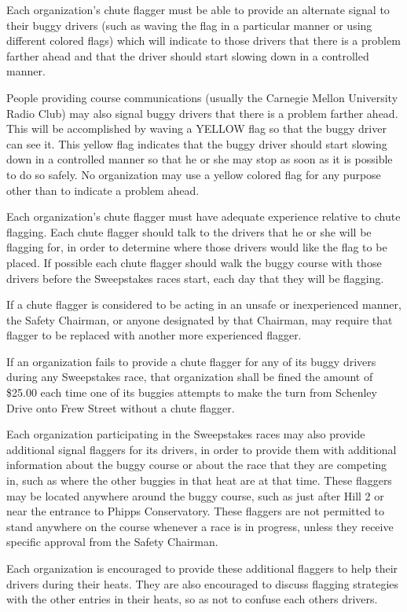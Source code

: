 Each organization's chute flagger must be able to provide an alternate signal to their buggy drivers (such as waving the flag in a particular manner or using different colored flags) which will indicate to those drivers that there is a problem farther ahead and that the driver should start slowing down in a controlled manner.

People providing course communications (usually the Carnegie Mellon University Radio Club) may also signal buggy drivers that there is a problem farther ahead. This will be accomplished by waving a YELLOW flag so that the buggy driver can see it. This yellow flag indicates that the buggy driver should start slowing down in a controlled manner so that he or she may stop as soon as it is possible to do so safely. No organization may use a yellow colored flag for any purpose other than to indicate a problem ahead.

Each organization's chute flagger must have adequate experience relative to chute flagging. Each chute flagger should talk to the drivers that he or she will be flagging for, in order to determine where those drivers would like the flag to be placed. If possible each chute flagger should walk the buggy course with those drivers before the Sweepstakes races start, each day that they will be flagging.

If a chute flagger is considered to be acting in an unsafe or inexperienced manner, the Safety Chairman, or anyone designated by that Chairman, may require that flagger to be replaced with another more experienced flagger.

If an organization fails to provide a chute flagger for any of its buggy drivers during any Sweepstakes race, that organization shall be fined the amount of \$25.00 each time one of its buggies attempts to make the turn from Schenley Drive onto Frew Street without a chute flagger.

Each organization participating in the Sweepstakes races may also provide additional signal flaggers for its drivers, in order to provide them with additional information about the buggy course or about the race that they are competing in, such as where the other buggies in that heat are at that time. These flaggers may be located anywhere around the buggy course, such as just after Hill 2 or near the entrance to Phipps Conservatory. These flaggers are not permitted to stand anywhere on the course whenever a race is in progress, unless they receive specific approval from the Safety Chairman.

Each organization is encouraged to provide these additional flaggers to help their drivers during their heats. They are also encouraged to discuss flagging strategies with the other entries in their heats, so as not to confuse each others drivers.

